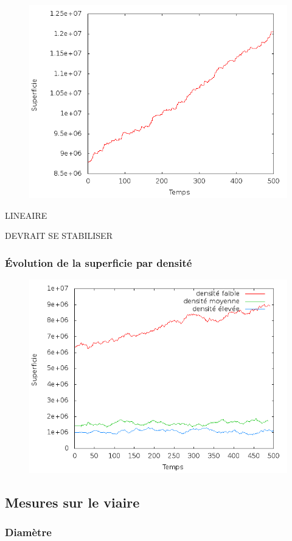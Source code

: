 \documentclass[12pt]{article}
\begin{document}
\begin{figure}[H]
  \centering
  \includegraphics[width=.8\linewidth]{images/area.png}
  \caption{}
\end{figure}

LINEAIRE

DEVRAIT SE STABILISER

\subsubsection{Évolution de la superficie par densité}

\begin{figure}[H]
  \centering
  \includegraphics[width=.8\linewidth]{images/area_ALL.png}
  \caption{}
\end{figure}

\subsection{Mesures sur le viaire}

\subsubsection{Diamètre}
\end{document}
